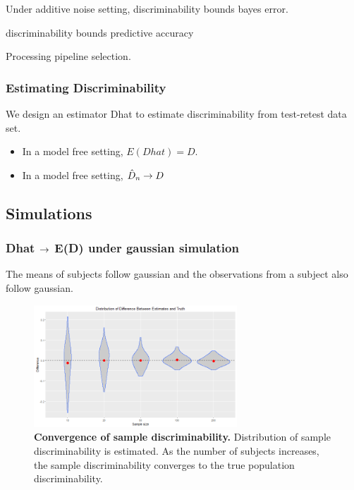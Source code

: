 \documentclass{article}
\begin{document}
 Under additive noise setting, discriminability bounds bayes error.

\begin{thm}
discriminability bounds predictive accuracy
\end{thm}

 Processing pipeline selection.

\subsubsection{Estimating Discriminability}

 We design an estimator Dhat to estimate discriminability from test-retest data set.

\begin{itemize}

\item In a model free setting, $E(Dhat)=D$.

\item In a model free setting, $\hat{D}_n \rightarrow D$
\end{itemize}


\subsection{Simulations}


\subsubsection{Dhat $\rightarrow$ E(D) under gaussian simulation}
 The means of subjects follow gaussian and the observations from a subject also follow gaussian. 

\begin{figure}[ht!]
	\includegraphics[width=3.0in]{../Figs/rel_conv.png}
	\caption{{\bf Convergence of sample discriminability.} Distribution of sample discriminability is estimated. As the number of subjects increases, the sample discriminability converges to the true population discriminability. }
	\label{fig:1}
\end{figure}
\end{document}
